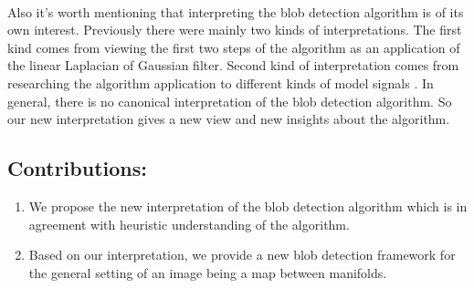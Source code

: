 \documentclass[twocolumn]{svjour3}          %
\begin{document}
\\
Also it's worth mentioning that interpreting the blob detection algorithm is of its own interest. Previously there were mainly two kinds of interpretations. The first kind comes from viewing the first two steps of the algorithm as an application of the linear Laplacian of Gaussian filter\cite{GenLapl, GenLaplNucl, ColorBlob}. Second kind of interpretation comes from researching the algorithm application to different kinds of model signals \cite{blob, JuctionBlob, CornVertDet, RectBlobs}. In general, there is no canonical interpretation of the blob detection algorithm. So our new interpretation gives a new view and new insights about the algorithm.
\subsection*{Contributions:}
\begin{enumerate}
\item We propose the new interpretation of the blob detection algorithm which is in agreement with heuristic understanding of the algorithm. 
\item Based on our interpretation, we provide a new blob detection framework for the general setting of an image being a map between manifolds.
\end{enumerate}
\end{document}
